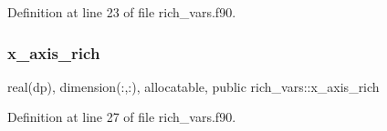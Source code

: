 Definition at line 23 of file rich\+\_\+vars.\+f90.

\mbox{\label{namespacerich__vars_a7f584d9b84f3e3e230b45ce4b8e0e9b1}} 
\subsubsection{\texorpdfstring{x\+\_\+axis\+\_\+rich}{x\_axis\_rich}}
{\footnotesize\ttfamily real(dp), dimension(\+:,\+:), allocatable, public rich\+\_\+vars\+::x\+\_\+axis\+\_\+rich}



Definition at line 27 of file rich\+\_\+vars.\+f90.

